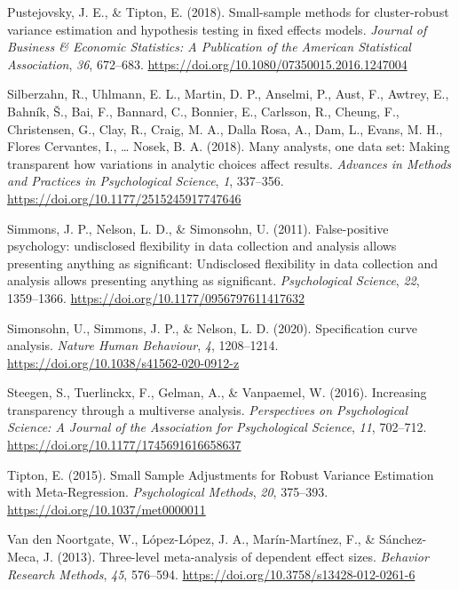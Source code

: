 \documentclass[
  man,
  longtable,
  nolmodern,
  notxfonts,
  notimes,
  colorlinks=true,linkcolor=blue,citecolor=blue,urlcolor=blue]{apa7}
\newlength{\cslhangindent}
\newenvironment{CSLReferences}[2] %
 {\begin{list}{}{%
  \setlength{\itemindent}{0pt}
  \setlength{\leftmargin}{0pt}
  \setlength{\parsep}{0pt}
  \ifodd #1
   \setlength{\leftmargin}{\cslhangindent}
   \setlength{\itemindent}{-1\cslhangindent}
  \fi
  \setlength{\itemsep}{#2\baselineskip}}}
 {\end{list}}
\begin{document}
\begin{CSLReferences}{1}{0}
Pustejovsky, J. E., \& Tipton, E. (2018). {Small-sample methods for
cluster-robust variance estimation and hypothesis testing in fixed
effects models}. \emph{Journal of Business \& Economic Statistics: A
Publication of the American Statistical Association}, \emph{36},
672--683. \url{https://doi.org/10.1080/07350015.2016.1247004}

Silberzahn, R., Uhlmann, E. L., Martin, D. P., Anselmi, P., Aust, F.,
Awtrey, E., Bahník, Š., Bai, F., Bannard, C., Bonnier, E., Carlsson, R.,
Cheung, F., Christensen, G., Clay, R., Craig, M. A., Dalla Rosa, A.,
Dam, L., Evans, M. H., Flores Cervantes, I., \ldots{} Nosek, B. A.
(2018). {Many analysts, one data set: Making transparent how variations
in analytic choices affect results}. \emph{Advances in Methods and
Practices in Psychological Science}, \emph{1}, 337--356.
\url{https://doi.org/10.1177/2515245917747646}

Simmons, J. P., Nelson, L. D., \& Simonsohn, U. (2011). {False-positive
psychology: undisclosed flexibility in data collection and analysis
allows presenting anything as significant: Undisclosed flexibility in
data collection and analysis allows presenting anything as significant}.
\emph{Psychological Science}, \emph{22}, 1359--1366.
\url{https://doi.org/10.1177/0956797611417632}

Simonsohn, U., Simmons, J. P., \& Nelson, L. D. (2020). {Specification
curve analysis}. \emph{Nature Human Behaviour}, \emph{4}, 1208--1214.
\url{https://doi.org/10.1038/s41562-020-0912-z}

Steegen, S., Tuerlinckx, F., Gelman, A., \& Vanpaemel, W. (2016).
{Increasing transparency through a multiverse analysis}.
\emph{Perspectives on Psychological Science: A Journal of the
Association for Psychological Science}, \emph{11}, 702--712.
\url{https://doi.org/10.1177/1745691616658637}

Tipton, E. (2015). {Small Sample Adjustments for Robust Variance
Estimation with Meta-Regression}. \emph{Psychological Methods},
\emph{20}, 375--393. \url{https://doi.org/10.1037/met0000011}

Van den Noortgate, W., López-López, J. A., Marín-Martínez, F., \&
Sánchez-Meca, J. (2013). {Three-level meta-analysis of dependent effect
sizes}. \emph{Behavior Research Methods}, \emph{45}, 576--594.
\url{https://doi.org/10.3758/s13428-012-0261-6}


\end{CSLReferences}
\end{document}
